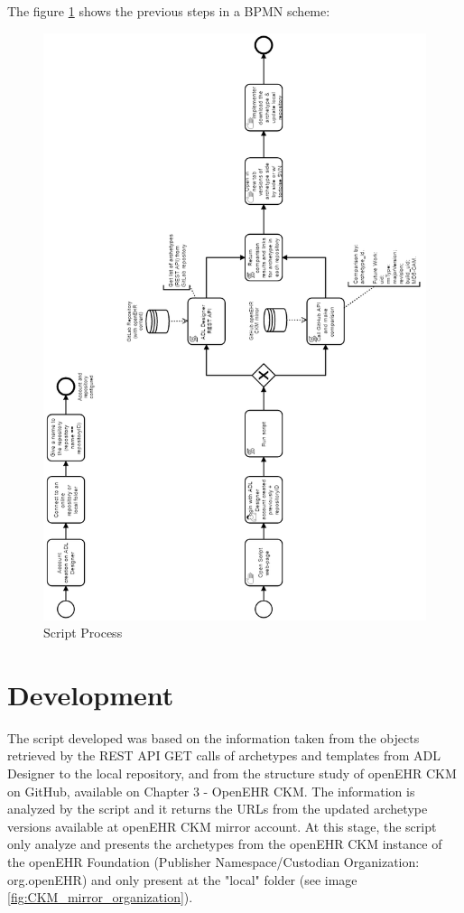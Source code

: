 \documentclass[mim_thesis.tex]{subfiles}
\begin{document}
 The figure \ref{fig:script_process} shows the previous steps in a \ac{BPMN} scheme:
 
\begin{figure}[H]
	\centering
    \includegraphics[width=1.07\textwidth]{img/script_process.PNG}
	\caption{Script Process}
	\label{fig:script_process}
\end{figure}

\section{Development}
The script developed was based on the information taken from the objects retrieved by the REST API GET calls of archetypes and templates from ADL Designer to the local repository, and from the structure study of openEHR CKM on GitHub, available on Chapter 3 - OpenEHR CKM. The information is analyzed by the script and it returns the URLs from the updated archetype versions available at openEHR CKM mirror account. At this stage, the script only analyze and presents the archetypes from the openEHR CKM instance of the openEHR Foundation (Publisher Namespace/Custodian Organization: org.openEHR) and only present at the "local" folder (see image \ref{fig:CKM_mirror_organization}).
\end{document}
